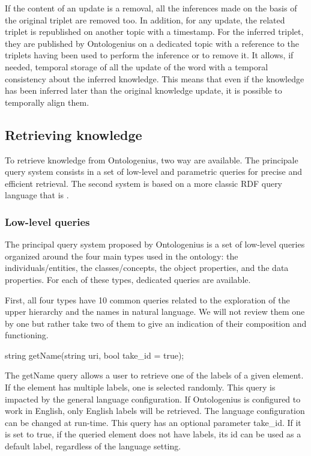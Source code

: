If the content of an update is a removal, all the inferences made on the basis of the original triplet are removed too. In addition, for any update, the related triplet is republished on another topic with a timestamp. For the inferred triplet, they are published by Ontologenius on a dedicated topic with a reference to the triplets having been used to perform the inference or to remove it. It allows, if needed, temporal storage of all the update of the word with a temporal consistency about the inferred knowledge. This means that even if the knowledge has been inferred later than the original knowledge update, it is possible to temporally align them.

\subsection{Retrieving knowledge}

To retrieve knowledge from Ontologenius, two way are available. The principale query system consists in a set of low-level and parametric queries for precise and efficient retrieval. The second system is based on a more classic RDF query language that is \sparql{}.

\subsubsection{Low-level queries}

The principal query system proposed by Ontologenius is a set of low-level queries organized around the four main types used in the ontology: the individuals/entities, the classes/concepts, the object properties, and the data properties. For each of these types, dedicated queries are available.

First, all four types have 10 common queries related to the exploration of the upper hierarchy and the names in natural language. We will not review them one by one but rather take two of them to give an indication of their composition and functioning. 

\begin{verbatimtab}
string getName(string uri, 
               bool take_id = true);
\end{verbatimtab}

The getName query allows a user to retrieve one of the labels of a given element. If the element has multiple labels, one is selected randomly. This query is impacted by the general language configuration. If Ontologenius is configured to work in English, only English labels will be retrieved. The language configuration can be changed at run-time. This query has an optional parameter take\_id. If it is set to true, if the queried element does not have labels, its id can be used as a default label, regardless of the language setting. 

